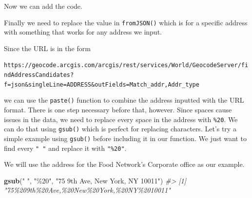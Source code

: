 \documentclass[
  12pt,
]{book}
\newenvironment{Shaded}{\begin{snugshade}}{\end{snugshade}}
\newcommand{\CommentTok}[1]{\textcolor[rgb]{0.56,0.35,0.01}{\textit{#1}}}
\newcommand{\ControlFlowTok}[1]{\textcolor[rgb]{0.13,0.29,0.53}{\textbf{#1}}}
\newcommand{\DecValTok}[1]{\textcolor[rgb]{0.00,0.00,0.81}{#1}}
\newcommand{\KeywordTok}[1]{\textcolor[rgb]{0.13,0.29,0.53}{\textbf{#1}}}
\newcommand{\NormalTok}[1]{#1}
\newcommand{\OperatorTok}[1]{\textcolor[rgb]{0.81,0.36,0.00}{\textbf{#1}}}
\newcommand{\StringTok}[1]{\textcolor[rgb]{0.31,0.60,0.02}{#1}}
\begin{document}
Now we can add the code.

\begin{Shaded}
\end{Shaded}

Finally we need to replace the value in \texttt{fromJSON()} which is for a specific address with something that works for any address we input.

Since the URL is in the form

\texttt{https://geocode.arcgis.com/arcgis/rest/services/World/GeocodeServer/findAddressCandidates?f=json\&singleLine=ADDRESS\&outFields=Match\_addr,Addr\_type}

we can use the \texttt{paste()} function to combine the address inputted with the URL format. There is one step necessary before that, however. Since spaces cause issues in the data, we need to replace every space in the address with \texttt{\%20}. We can do that using \texttt{gsub()} which is perfect for replacing characters. Let's try a simple example using \texttt{gsub()} before including it in our function. We just want to find every \texttt{"\ "} and replace it with \texttt{"\%20"}.

We will use the address for the Food Network's Corporate office as our example.

\begin{Shaded}
\begin{Highlighting}[]
\KeywordTok{gsub}\NormalTok{(}\StringTok{" "}\NormalTok{, }\StringTok{"\%20"}\NormalTok{, }\StringTok{"75 9th Ave, New York, NY 10011"}\NormalTok{)}
\CommentTok{\#> [1] "75\%209th\%20Ave,\%20New\%20York,\%20NY\%2010011"}
\end{Highlighting}
\end{Shaded}
\end{document}
